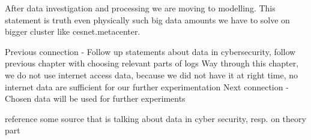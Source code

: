 After data investigation and processing we are moving to modelling. This statement is truth even physically such big data amounts we have to solve on bigger cluster like cesnet.metacenter.


Previous connection
- Follow up statements about data in cybersecurity, follow previous chapter with choosing relevant parts of logs
Way through this chapter, we do not use internet access data, because we did not have it at right time, no internet data are sufficient for our further experimentation
Next connection
- Chosen data will be used for further experiments


reference some source that is talking about data in cyber security, resp. on theory part
  
  

